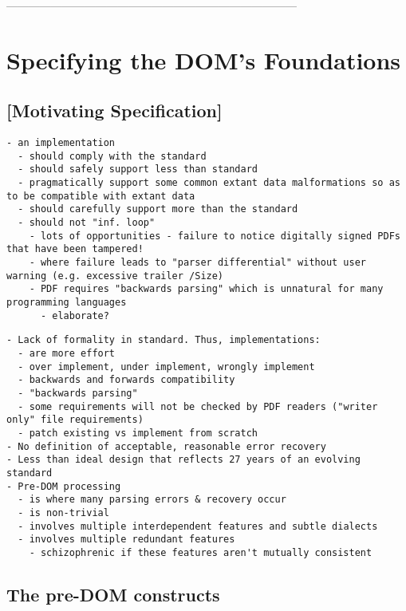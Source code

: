 ------------------------------------------------------------------------------
\section{Specifying the DOM's Foundations }
\label{sec:specifying}


\subsection{[Motivating Specification]}

\begin{lstlisting}[style=meta]
- an implementation
  - should comply with the standard
  - should safely support less than standard
  - pragmatically support some common extant data malformations so as to be compatible with extant data
  - should carefully support more than the standard
  - should not "inf. loop"
    - lots of opportunities - failure to notice digitally signed PDFs that have been tampered!
    - where failure leads to "parser differential" without user warning (e.g. excessive trailer /Size)
    - PDF requires "backwards parsing" which is unnatural for many programming languages
      - elaborate?
\end{lstlisting}

\begin{lstlisting}[style=meta]
- Lack of formality in standard. Thus, implementations:
  - are more effort
  - over implement, under implement, wrongly implement
  - backwards and forwards compatibility
  - "backwards parsing"
  - some requirements will not be checked by PDF readers ("writer only" file requirements) 
  - patch existing vs implement from scratch
- No definition of acceptable, reasonable error recovery
- Less than ideal design that reflects 27 years of an evolving standard
- Pre-DOM processing
  - is where many parsing errors & recovery occur
  - is non-trivial
  - involves multiple interdependent features and subtle dialects
  - involves multiple redundant features
    - schizophrenic if these features aren't mutually consistent
\end{lstlisting}

\subsection{The pre-DOM constructs}

